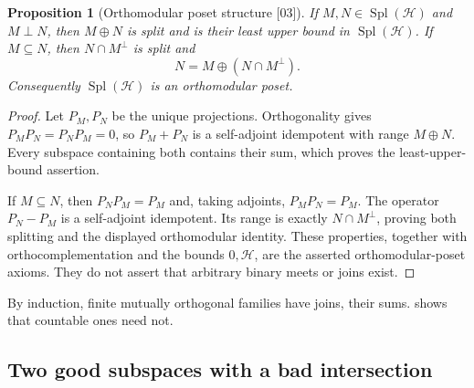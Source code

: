 \documentclass[11pt,letterpaper]{article}
\numberwithin{equation}{section}
\newtheorem{proposition}[proposition]{Proposition}
\theoremstyle{definition}
\theoremstyle{remark}
\newcommand{\cH}{\mathcal H}
\newcommand{\Spl}{\operatorname{Spl}}
\newcommand{\src}[1]{\textup{\textsf{\small[#1]}}}
\begin{document}
\begin{proposition}[Orthomodular poset structure \src{03}]\label{hgeo:prop:poset}
If $M,N\in\Spl(\cH)$ and $M\perp N$, then $M\oplus N$ is split
and is their least upper bound in $\Spl(\cH)$. If $M\subseteq N$,
then $N\cap M^\perp$ is split and
\[
 N=M\oplus(N\cap M^\perp).
\]
Consequently $\Spl(\cH)$ is an orthomodular poset.
\end{proposition}
\begin{proof}
Let $P_M,P_N$ be the unique projections. Orthogonality gives
$P_MP_N=P_NP_M=0$, so $P_M+P_N$ is a self-adjoint idempotent with
range $M\oplus N$. Every subspace containing both contains their sum,
which proves the least-upper-bound assertion.

If $M\subseteq N$, then $P_NP_M=P_M$ and, taking adjoints,
$P_MP_N=P_M$. The operator $P_N-P_M$ is a self-adjoint idempotent.
Its range is exactly $N\cap M^\perp$, proving both splitting and the
displayed orthomodular identity. These properties, together with
orthocomplementation and the bounds $0,\cH$, are the asserted
orthomodular-poset axioms. They do not assert that arbitrary binary
meets or joins exist.
\end{proof}

By induction, finite mutually orthogonal families have joins, their sums.
 shows that countable ones need not.

\subsection{Two good subspaces with a bad intersection}
\end{document}
